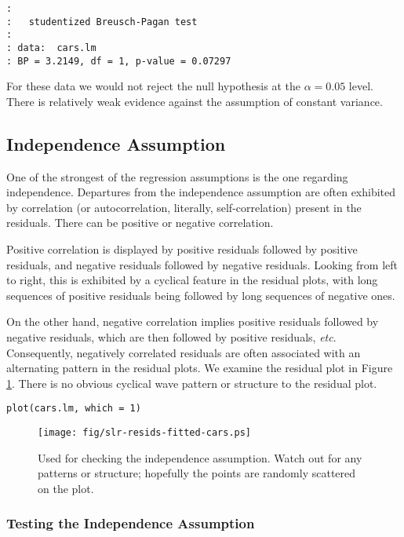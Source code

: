 \begin{verbatim}
: 
: 	studentized Breusch-Pagan test
: 
: data:  cars.lm
: BP = 3.2149, df = 1, p-value = 0.07297
\end{verbatim}

For these data we would not reject the null hypothesis at the
\(\alpha=0.05\) level. There is relatively weak evidence against the
assumption of constant variance.

\subsection{Independence Assumption}
\label{sec-11-4-3}

One of the strongest of the regression assumptions is the one
regarding independence. Departures from the independence assumption
are often exhibited by correlation (or autocorrelation, literally,
self-correlation) present in the residuals. There can be positive or
negative correlation.

Positive correlation is displayed by positive residuals followed by
positive residuals, and negative residuals followed by negative
residuals. Looking from left to right, this is exhibited by a cyclical
feature in the residual plots, with long sequences of positive
residuals being followed by long sequences of negative ones.

On the other hand, negative correlation implies positive residuals
followed by negative residuals, which are then followed by positive
residuals, \emph{etc}. Consequently, negatively correlated residuals are
often associated with an alternating pattern in the residual plots. We
examine the residual plot in Figure \ref{fig-resids-fitted-cars}. There is no
obvious cyclical wave pattern or structure to the residual plot.

\begin{verbatim}
plot(cars.lm, which = 1)
\end{verbatim}

\begin{figure}[ht!]
\centering
\texttt{[image: fig/slr-resids-fitted-cars.ps]}
\caption[Plot of the residuals versus the fitted values for the \texttt{cars} data]{\label{fig-resids-fitted-cars}\small Used for checking the independence assumption. Watch out for any patterns or structure; hopefully the points are randomly scattered on the plot.}
\end{figure}

\subsubsection{Testing the Independence Assumption}
\label{sec-11-4-3-1}

